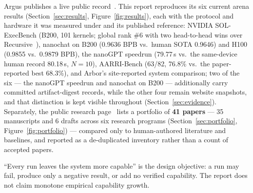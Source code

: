 Argus publishes a live public record~\cite{argus_results}. This report reproduces
its six current arena results (Section~\ref{sec:results},
Figure~\ref{fig:results}), each with the protocol and hardware it was measured
under and its published reference: NVIDIA SOL-ExecBench (B200, 101 kernels; global
rank \#6 with two head-to-head wins over Recursive~\cite{recursive2026firststeps}),
nanochat on B200 (0.9636 BPB vs.\ human SOTA 0.9646) and H100 (0.9855 vs.\ 0.9879
BPB), the nanoGPT speedrun (79.77\,s vs.\ the same-device human record 80.18\,s,
$N{=}10$), AARRI-Bench (63/82, 76.8\% vs.\ the paper-reported best 68.3\%), and
Arbor's site-reported system comparison; two of the six --- the nanoGPT speedrun
and nanochat on B200 --- additionally carry committed artifact-digest records,
while the other four remain website snapshots, and that distinction is kept
visible throughout (Section~\ref{sec:evidence}). Separately, the public research
page~\cite{argus_research} lists a portfolio of \textbf{41 papers} --- 35
manuscripts and 6 drafts across six research programs
(Section~\ref{sec:portfolio}, Figure~\ref{fig:portfolio}) --- compared only to
human-authored literature and baselines, and reported as a de-duplicated inventory
rather than a count of accepted papers.

\begin{callout}
``Every run leaves the system more capable'' is the design objective: a run may
fail, produce only a negative result, or add no verified capability. The report
does not claim monotone empirical capability growth.
\end{callout}
